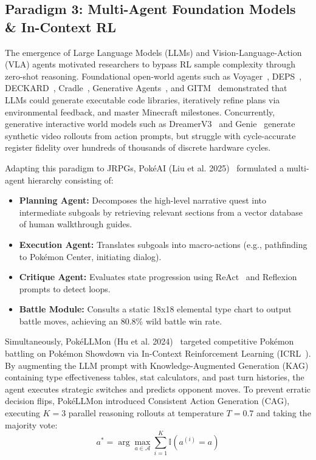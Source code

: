 \documentclass[journal,10pt,twocolumn]{IEEEtran}
\begin{document}
\subsection{Paradigm 3: Multi-Agent Foundation Models \& In-Context RL}
The emergence of Large Language Models (LLMs) and Vision-Language-Action (VLA) agents motivated researchers to bypass RL sample complexity through zero-shot reasoning. Foundational open-world agents such as Voyager~\cite{wang2023voyager}, DEPS~\cite{wang2023deps}, DECKARD~\cite{notman2023deckard}, Cradle~\cite{tan2024cradle}, Generative Agents~\cite{park2023generative}, and GITM~\cite{zhu2023gitm} demonstrated that LLMs could generate executable code libraries, iteratively refine plans via environmental feedback, and master Minecraft milestones. Concurrently, generative interactive world models such as DreamerV3~\cite{hafner2024dreamerv3} and Genie~\cite{bruce2024genie} generate synthetic video rollouts from action prompts, but struggle with cycle-accurate register fidelity over hundreds of thousands of discrete hardware cycles.

Adapting this paradigm to JRPGs, Pok{\'e}AI (Liu et al. 2025)~\cite{liu2025pokeai} formulated a multi-agent hierarchy consisting of:
\begin{itemize}
    \item \textbf{Planning Agent:} Decomposes the high-level narrative quest into intermediate subgoals by retrieving relevant sections from a vector database of human walkthrough guides.
    \item \textbf{Execution Agent:} Translates subgoals into macro-actions (e.g., pathfinding to Pok{\'e}mon Center, initiating dialog).
    \item \textbf{Critique Agent:} Evaluates state progression using ReAct~\cite{yao2023react} and Reflexion~\cite{shinn2023reflexion} prompts to detect loops.
    \item \textbf{Battle Module:} Consults a static 18x18 elemental type chart to output battle moves, achieving an 80.8\% wild battle win rate.
\end{itemize}

Simultaneously, Pok{\'e}LLMon (Hu et al. 2024)~\cite{hu2024pokellmon} targeted competitive Pok{\'e}mon battling on Pok{\'e}mon Showdown via In-Context Reinforcement Learning (ICRL~\cite{laskin2023incontext}). By augmenting the LLM prompt with Knowledge-Augmented Generation (KAG) containing type effectiveness tables, stat calculators, and past turn histories, the agent executes strategic switches and predicts opponent moves. To prevent erratic decision flips, Pok{\'e}LLMon introduced Consistent Action Generation (CAG), executing $K=3$ parallel reasoning rollouts at temperature $T=0.7$ and taking the majority vote:
\begin{equation}
a^* = \arg\max_{a \in \mathcal{A}} \sum_{i=1}^K \mathbb{I}\left( a^{(i)} = a \right)
\end{equation}
\end{document}
